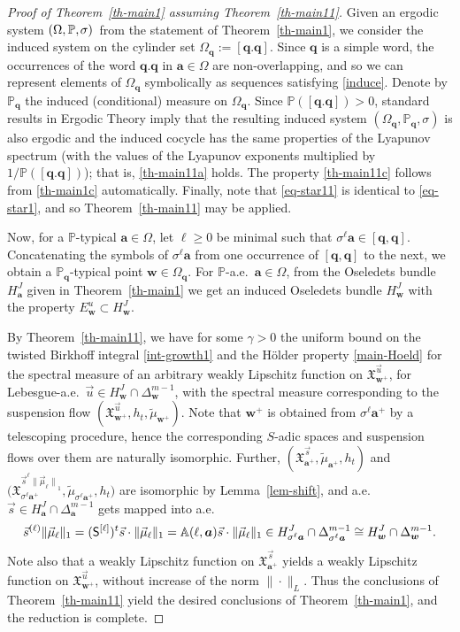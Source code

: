 \documentclass[10pt]{amsart}
\theoremstyle{plain}
\theoremstyle{definition}
\let\wt\widetilde
\newcommand\bom{{\boldsymbol a}}\let\ba\bom
\newcommand\bq{{\boldsymbol q}}
\newcommand\bw{{\boldsymbol w}}
\newcommand\bqcyl{[\bq.\bq]}
\let\gam\gamma
\let\Om\Omega
\let\sig\sigma
\newcommand\Xx{\mathfrak{X}}
\newcommand\Aa{\mathbb{A}}
\renewcommand{\P}{\mathbb{P}}
\newcommand\Sf{{\sf S}}
\begin{document}
\begin{proof}[Proof of Theorem~\ref{th-main1} assuming Theorem~\ref{th-main11}] Given an ergodic system $(\Om,\P,\mkern-1mu\sig)$~from the statement of Theorem~\ref{th-main1}, we consider the induced system on the cylinder set
$\Om_\bq:= [\bq.\bq]$.
Since $\bq$ is a simple word, the occurrences of the word $\bq.\bq$ in $\bom\in \Om$ are non-overlapping, and so
we can represent elements of $\Om_\bq$ symbolically as sequences satisfying \eqref{induce}. Denote by $\P_{\!\!\bq}$ the induced (conditional) measure on $\Om_\bq$. Since $\P([\bq.\bq])>0$, standard results in Ergodic Theory imply that the resulting induced system $(\Om_\bq,\P_{\!\!\bq},\sig)$ is also ergodic and the induced cocycle has the same properties of the Lyapunov spectrum (with the values of the Lyapunov exponents multiplied by $1/\P(\bqcyl)$); that is, \eqref{th-main11a} holds. The property \eqref{th-main11c} follows from \eqref{th-main1c} automatically. Finally, note that \eqref{eq-star11} is identical to \eqref{eq-star1}, and
so Theorem~\ref{th-main11} may be applied.

Now, for a $\P$-typical $\ba\in \Om$, let $\ell\ge 0$ be minimal such that $\sig^\ell\ba \in [\bq,\bq]$. Concatenating the symbols of $\sig^\ell\ba$ from one occurrence of $[\bq,\bq]$ to the next, we
obtain a $\P_{\!\!\bq}$-typical point $\bw\in \Om_\bq$.
For $\P$-a.e.\ $\ba\in \Om$, from the Oseledets bundle $H_\ba^J$ given in Theorem~\ref{th-main1} we get an induced Oseledets bundle $H_\bw^J$ with the property $E^u_\bw \subset H_\bw^J$.

By
Theorem~\ref{th-main11}, we have for some $\gam>0$ the uniform bound on the twisted Birkhoff integral \eqref{int-growth1} and the Hölder property \eqref{main-Hoeld}
for the spectral measure of an arbitrary
weakly Lipschitz function on $\Xx_{\bw^+}^{\vec u}$, for Lebesgue-a.e.\ $\vec u\in H_\bw^J\cap \Delta_\bw^{m-1}$, with the spectral measure corresponding to the suspension flow
$(\Xx_{\bw^+}^{\vec u}, h_t,\wt\mu_{\bw^+})$. Note that $\bw^+$ is obtained from $\sig^\ell\ba^+$ by a telescoping procedure, hence the corresponding $S$-adic spaces and suspension flows over them are naturally isomorphic. Further, $(\Xx_{\ba^+}^{\vec{s}},\wt{\mu}_{\bom^+},h_t)$ and $\bigl(\Xx_{\sig^\ell\ba^+}^{\vec{s}^{\ell}{\|\vec \mu_\ell\|}_1},\wt{\mu}_{\sig^\ell\bom^+},h_t\bigr)$ are isomorphic
by Lemma~\ref{lem-shift}, and a.e.\ $\vec s\in H^J_\ba\cap \Delta_\ba^{m-1}$ gets mapped into a.e.
\[
\vec s^{(\ell)}\|\vec\mu_\ell\|_1 = (\Sf^{[\ell]})^t \vec s \cdot\|\vec\mu_\ell\|_1 = \Aa(\ell,\ba)\vec s\cdot \|\vec\mu_\ell\|_1\in H_{\sig^\ell\ba}^J\cap \Delta^{m-1}_{\sig^\ell\ba}\cong H_\bw^J\cap \Delta_\bw^{m-1}.
\]
Note also that a weakly Lipschitz function on $\Xx_{\ba^+}^{\vec{s}}$ yields a weakly Lipschitz function on $\Xx_{\bw^+}^{\vec u}$, without increase of the norm $\|\cdot\|_L$. Thus the conclusions of Theorem~\ref{th-main11} yield the desired conclusions of Theorem~\ref{th-main1}, and the
reduction is complete.
\end{proof}
\end{document}
